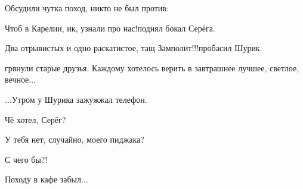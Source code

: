 {Обсудили чутка поход, никто не был против:

\diagdash Чтоб в Карелии, ик, узнали про нас!\mdash поднял бокал Серёга.

\diagdash Два отрывистых и одно раскатистое, тащ Замполит!!!\mdash пробасил Шурик.

\mdash грянули старые друзья. Каждому хотелось верить в завтрашнее лучшее, светлое, вечное$\ldots$

\vspace{1.2cm}

$\ldots$Утром у Шурика зажужжал телефон. 

\diagdash Чё хотел, Серёг?

\diagdash У тебя нет, случайно, моего пиджака?

\diagdash С чего бы?!

\diagdash Походу в кафе забыл$\ldots$

\begin{center}
\end{center}
}